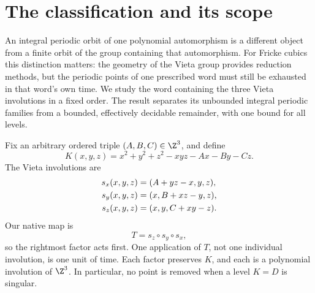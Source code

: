 \section{The classification and its scope}\label{sec:introduction}

An integral periodic orbit of one polynomial automorphism is a different
object from a finite orbit of the group containing that automorphism.
For Fricke cubics this distinction matters: the geometry of the Vieta
group provides reduction methods, but the periodic points of one
prescribed word must still be exhausted in that word's own time.
We study the word containing the three Vieta involutions in a fixed order.
The result separates its unbounded integral periodic families from a
bounded, effectively decidable remainder, with one bound for all levels.

Fix an arbitrary ordered triple \((A,B,C)\in\Z^3\), and define
\begin{equation}\label{eq:invariant}
 K(x,y,z)=x^2+y^2+z^2-xyz-Ax-By-Cz.
\end{equation}
The Vieta involutions are
\begin{align}
 s_x(x,y,z)&=(A+yz-x,y,z),\notag\\
 s_y(x,y,z)&=(x,B+xz-y,z),\label{eq:involutions}\\
 s_z(x,y,z)&=(x,y,C+xy-z).\notag
\end{align}
Our native map is
\begin{equation}\label{eq:native}
 T=s_z\circ s_y\circ s_x,
\end{equation}
so the rightmost factor acts first. One application of \(T\), not one
individual involution, is one unit of time. Each factor preserves
\(K\), and each is a polynomial involution of \(\Z^3\). In particular,
no point is removed when a level \(K=D\) is singular.

